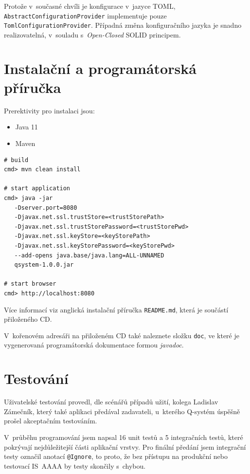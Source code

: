 \documentclass[thesis=M,czech]{FITthesis}[2019/12/23]
\begin{document}
Protože v~současné chvíli je konfigurace v~jazyce TOML, \\\texttt{AbstractConfigurationProvider} implementuje pouze \\\texttt{TomlConfigurationProvider}. Případná změna konfiguračního jazyka je snadno realizovatelná, v~souladu s~\textit{Open-Closed} SOLID principem.

\newpage
\section{Instalační a programátorská příručka}
Prerektivity pro instalaci jsou:
\begin{itemize}
	\item Java 11
	\item Maven
\end{itemize}

\begin{lstlisting}[frame=single,caption=Jak sestavit build a spustit aplikaci,label=formatMAIL]
# build
cmd> mvn clean install

# start application
cmd> java -jar 
   -Dserver.port=8080
   -Djavax.net.ssl.trustStore=<trustStorePath>
   -Djavax.net.ssl.trustStorePassword=<trustStorePwd>
   -Djavax.net.ssl.keyStore=<keyStorePath>
   -Djavax.net.ssl.keyStorePassword=<keyStorePwd>
   --add-opens java.base/java.lang=ALL-UNNAMED 
   qsystem-1.0.0.jar

# start browser
cmd> http://localhost:8080
\end{lstlisting}

Více informací viz anglická instalační příručka \texttt{README.md}, která je součástí přiloženého CD.

V~kořenovém adresáři na přiloženém CD také naleznete složku  \texttt{doc}, ve které je vygenerovaná programátorská dokumentace formou \textit{javadoc}.

\section{Testování}
Uživatelské testování provedl, dle scénářů případů užití, kolega Ladislav Zámečník, který také aplikaci předával zadavateli, u~kterého Q-systém úspěšně prošel akceptačním testováním.

V~průběhu programování jsem napsal 16 unit testů a 5 integračních testů, které pokrývají nejdůležitejší části aplikační vrstvy. Pro finální předání jsem integrační testy označil anotací \texttt{@Ignore}, to proto, že bez přístupu na produkční nebo testovací IS~AAAA by testy skončily s~chybou.
\end{document}
